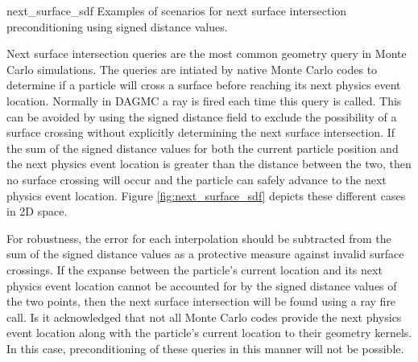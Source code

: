              {next_surface_sdf}
             {Examples of scenarios for next surface intersection preconditioning using signed distance values.}
             {
               Next surface intersection queries are the most common geometry
               query in Monte Carlo simulations. The queries are intiated by
               native Monte Carlo codes to determine if a particle will cross a
               surface before reaching its next physics event
               location. Normally in DAGMC a ray is fired each time this query
               is called. This can be avoided by using the signed distance
               field to exclude the possibility of a surface crossing without
               explicitly determining the next surface intersection. If the sum
               of the signed distance values for both the current particle
               position and the next physics event location is greater than the
               distance between the two, then no surface crossing will occur
               and the particle can safely advance to the next physics event
               location. Figure \ref{fig:next_surface_sdf} depicts these
               different cases in 2D space.
               
               For robustness, the error for each interpolation should be
               subtracted from the sum of the signed distance values as a
               protective measure against invalid surface crossings. If the
               expanse between the particle's current location and its next
               physics event location cannot be accounted for by the signed
               distance values of the two points, then the next surface
               intersection will be found using a ray fire
               call. Is it acknowledged that not all
               Monte Carlo codes provide the next physics event location along
               with the particle's current location to their geometry
               kernels. In this case, preconditioning of these queries in this
               manner will not be possible.
              }

